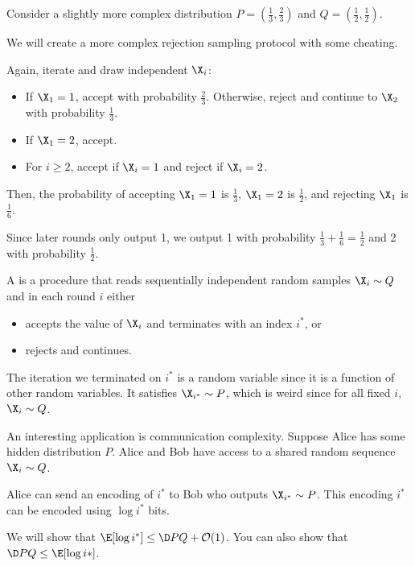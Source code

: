\documentclass[class=co432,notes,tikz]{agony}
\begin{document}
\begin{example}
  Consider a slightly more complex distribution $P = (\frac13,\frac23)$
  and $Q = (\frac12,\frac12)$.
\end{example}
\begin{sol}
  We will create a more complex rejection sampling protocol with some cheating.

  Again, iterate and draw independent $\X_i$:
  \begin{itemize}
    \item If $\X_1 = 1$, accept with probability $\frac23$.
          Otherwise, reject and continue to $\X_2$ with probability $\frac13$.
    \item If $\X_1 = 2$, accept.
    \item For $i \geq 2$, accept if $\X_i = 1$ and reject if $\X_i = 2$.
  \end{itemize}
  Then, the probability of accepting $\X_1 = 1$ is $\frac13$,
  $\X_1 = 2$ is $\frac12$, and rejecting $\X_1$ is $\frac16$.

  Since later rounds only output 1,
  we output 1 with probability $\frac13 + \frac16 = \frac12$
  and 2 with probability $\frac12$.
\end{sol}

\begin{defn}
  A  is a procedure that reads sequentially independent
  random samples $\X_i \sim Q$ and in each round $i$ either
  \begin{itemize}[nosep]
    \item accepts the value of $\X_i$ and terminates with an index $i^*$, or
    \item rejects and continues.
  \end{itemize}

  The iteration we terminated on $i^*$ is a random variable
  since it is a function of other random variables. It satisfies
  $\X_{i^*} \sim P$, which is weird since for all fixed $i$, $\X_i \sim Q$.
\end{defn}

An interesting application is communication complexity.
Suppose Alice has some hidden distribution $P$.
Alice and Bob have access to a shared random \iid sequence $\X_i \sim Q$.

Alice can send an encoding of $i^*$ to Bob who outputs $\X_{i^*} \sim P$.
This encoding $i^*$ can be encoded using $\log i^*$ bits.

We will show that $\E[\log i^*] \leq \D P Q + \order{1}$.
You can also show that $\D P Q \leq \E[\log i*]$.
\end{document}
